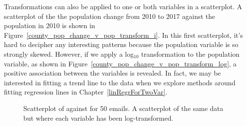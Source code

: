 Transformations can also be applied to one or both
variables in a scatterplot.
A scatterplot of the the population change from 2010 to 2017
against the population in 2010 is shown in Figure~\ref{county_pop_change_v_pop_transform_i}.
In this first scatterplot, it's hard to decipher any
interesting patterns because the population variable
is so strongly skewed.
However, if we apply a log$_{10}$ transformation to
the population variable, as shown in
Figure~\ref{county_pop_change_v_pop_transform_log},
a positive association between the variables is revealed.
In fact, we may be interested in fitting a trend line to
the data when we explore methods around fitting regression
lines in Chapter~\ref{linRegrForTwoVar}.

\begin{figure}
\centering
{}
\caption{ Scatterplot of  against  for 50 emails.  A scatterplot of the same data but where each variable has been log-transformed.}
\label{county_pop_change_v_pop_transform_main}
\end{figure}

